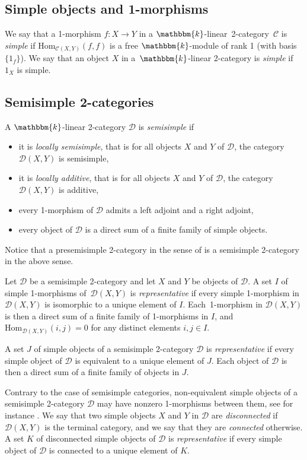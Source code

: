 \documentclass[a4paper, oneside]{amsart}
\numberwithin{equation}{subsection}
\theoremstyle{referencedlemma}
\theoremstyle{plain} %
\theoremstyle{remark}
\begin{document}
\subsection{Simple objects and 1-morphisms}

We say that a 1-morphism $f\colon X \to Y$ in a $\mathbbm{k}$-linear~2-category~$\mathcal{C}$ is \emph{simple} if $\mathrm{Hom}_{\mathcal{C}(X,Y)}(f,f)$ is a free $\mathbbm{k}$-module of rank 1 (with basis $\{1_f\}$).  We say that an object $X$ in a~$\mathbbm{k}$-linear 2-category is \emph{simple} if $1_X$ is simple. 

\subsection{Semisimple 2-categories} A $\mathbbm{k}$-linear 2-category $\mathcal{D}$ is \emph{semisimple} if 
\begin{itemize}
\item it is \emph{locally semisimple}, that is for all objects $X$ and $Y$ of $\mathcal{D}$, the category $\mathcal{D}(X,Y)$ is semisimple,
\item it is \emph{locally additive}, that is for all objects $X$ and $Y$ of $\mathcal{D}$, the category $\mathcal{D}(X,Y)$ is additive,
\item every 1-morphism of $\mathcal{D}$ admits a left adjoint and a right adjoint,
\item every object of $\mathcal{D}$ is a direct sum of a finite family of simple objects.
\end{itemize}
Notice that a presemisimple 2-category in the sense of \cite[Definition 1.2.7]{douglas_fusion_2018} is a semisimple 2-category in the above sense. 

Let $\mathcal{D}$ be a semisimple 2-category and let $X$ and $Y$ be objects of $\mathcal{D}$. A set $I$ of simple 1-morphisms of~$\mathcal{D}(X,Y)$ is \emph{representative} if every simple 1-morphism in $\mathcal{D}(X,Y)$ is isomorphic to a unique element of $I$.  Each~1-morphism in $\mathcal{D}(X,Y)$ is then a direct sum of a finite family of 1-morphisms in $I$, and $\mathrm{Hom}_{\mathcal{D}(X,Y)}(i,j) = 0$ for any distinct elements $i,j\in I$. 

A set $J$ of simple objects of a semisimple 2-category $\mathcal{D}$ is \emph{representative} if every simple object of $\mathcal{D}$ is equivalent to a unique element of $J$.  Each object of $\mathcal{D}$ is then a direct sum of a finite family of objects in $J$.  

Contrary to the case of semisimple categories,  non-equivalent simple objects of a semisimple 2-category $\mathcal{D}$ may have nonzero 1-morphisms between them, see for instance \cite[Example 1.4.14]{douglas_fusion_2018}. We say that two simple objects $X$ and $Y$ in $\mathcal{D}$ are \emph{disconnected} if $\mathcal{D}(X,Y)$ is the terminal category, and we say that they are \emph{connected} otherwise. A set $K$ of disconnected simple objects of $\mathcal{D}$ is \emph{representative} if every simple object of $\mathcal{D}$ is connected to a unique element of $K$.
\end{document}
